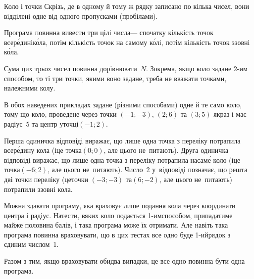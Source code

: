 \documentclass[14pt,a4paper]{extarticle}
\begin{document}
\begin{problemAllDefault}{Коло і точки}
Скрізь, де в одному й тому ж рядку записано по кілька чисел, вони відділені одне від одного пропусками (пробілами).


\OutputFile Програма повинна вивести три цілі числа\nolinebreak[3] --- спочатку кількість точок всер\'{е}\-дині\nolinebreak[2] к\'{о}ла, потім кількість точок на самому к\'{о}лі, потім кількість точок ззовні к\'{о}ла.

Сума цих трьох чисел повинна дорівнювати~$N$. Зокрема, якщо коло задане \mbox{2-им} способом, то ті три точки, якими воно задане, треба не вважати точками, належними колу.



\Examples
\begin{exampleSimple}{7em}{3em}%
%
\end{exampleSimple}
\begin{exampleSimple}{7em}{3em}%
%
\end{exampleSimple}

\Notes
В обох наведених прикладах задане (різними способами) одне й те само коло, тому що коло, проведене через точки $(-1; -3)$, $(2; 6)$ та $(3; 5)$ якраз і має радіус~5 та центр у\nolinebreak[3] точці\nolinebreak[3] $(-1; 2)$.

Перша одиничка відповіді виражає, що лише одна точка з переліку потрапила всер\'{е}\-дину кола (і\nolinebreak[3] це точка\nolinebreak[3] $(0; 0)$, але цього не~питають). Друга одиничка відповіді виражає, що лише одна точка з переліку потрапила на\nolinebreak[3] сам\'{е} коло (і\nolinebreak[3] це точка\nolinebreak[3] $(-6; 2)$, але цього не~питають). Число~2 у~відповіді позначає, що решта дві точки переліку (це\nolinebreak[3] точки $(-3; -3)$ та\nolinebreak[3] $(6; -2)$, але цього не~питають) потрапили ззовні кола.

Можна здавати програму, яка враховує лише подання кола через координати центра і радіус. На\nolinebreak[3] тести, в\nolinebreak[3] яких коло подається \mbox{1-им}\nolinebreak[3] способом, припадатиме майже половина балів, і така програма може їх отримати. Але навіть така програма повинна враховувати, що в цих тестах все одно буде \mbox{1-ий}\nolinebreak[3] рядок з єдиним числом~1.

Разом з тим, якщо враховувати обидва випадки, це все одно повинна бути одна програма.

\end{problemAllDefault}
	
\end{document}
